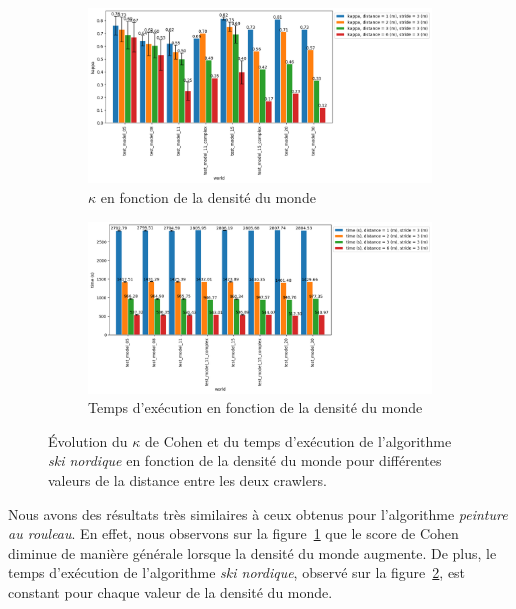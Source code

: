 \documentclass[english,RandD]{rapportPFE}  %
\begin{document}
			\begin{figure}[h!]
				\centering
				\begin{subfigure}[t]{0.9\linewidth}
					\includegraphics[width=\linewidth]{graphics/ski_nordique-kappa_vs_world_for_each_d.png}
					\caption{$\kappa$ en fonction de la densité du monde}
					\label{fig:ski_nordique-kappa_vs_world_d}
				\end{subfigure}
				\hfill
				\begin{subfigure}[t]{0.9\linewidth}
						\includegraphics[width=\linewidth]{graphics/ski_nordique-time_vs_world_for_each_d.png}
						\caption{Temps d'exécution en fonction de la densité du monde}
						\label{fig:ski_nordique-time_vs_world_d}
				\end{subfigure}
				\caption{Évolution du $\kappa$ de Cohen et du temps d'exécution de l'algorithme \textit{ski nordique} en fonction de la densité du monde pour différentes valeurs de la distance entre les deux crawlers.}
				\label{fig:ski_nordique-world_d}
			\end{figure}

			Nous avons des résultats très similaires à ceux obtenus pour l'algorithme \textit{peinture au rouleau}.
			En effet, nous observons sur la figure~\ref{fig:ski_nordique-kappa_vs_world_d} que le score de Cohen diminue de manière générale lorsque la densité du monde augmente.
			De plus, le temps d'exécution de l'algorithme \textit{ski nordique}, observé sur la figure~\ref{fig:ski_nordique-time_vs_world_d}, est constant pour chaque valeur de la densité du monde.
\end{document}
